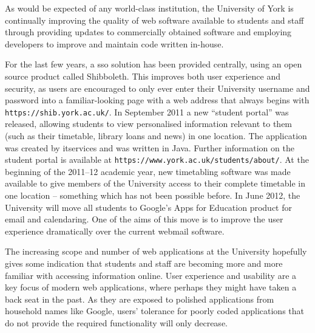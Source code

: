 
As would be expected of any world-class institution, the University of York is
continually improving the quality of web software available to students and
staff through providing updates to commercially obtained software and
employing developers to improve and maintain code written in-house.

For the last few years, a \gls{sso} solution has been provided centrally,
using an open source product called Shibboleth. This improves both user
experience and security, as users are encouraged to only ever enter their
University username and password into a familiar-looking page with a web
address that always begins with \texttt{https://shib.york.ac.uk/}. In
September 2011 a new ``student portal'' was released, allowing students to
view personalised information relevant to them (such as their timetable,
library loans and news) in one location. The application was created by
\gls{itservices} and was written in Java. Further information on the student
portal is available at \texttt{https://www.york.ac.uk/students/about/}. At the
beginning of the 2011--12 academic year, new timetabling software was made
available to give members of the University access to their complete timetable
in one location -- something which has not been possible before. In June 2012,
the University will move all students to Google's Apps for Education product
for email and calendaring. One of the aims of this move is to improve the user
experience dramatically over the current webmail software.

The increasing scope and number of web applications at the University
hopefully gives some indication that students and staff are becoming more and
more familiar with accessing information online. User experience and usability
are a key focus of modern web applications, where perhaps they might have
taken a back seat in the past. As they are exposed to polished applications
from household names like Google, users' tolerance for poorly coded
applications that do not provide the required functionality will only
decrease.

